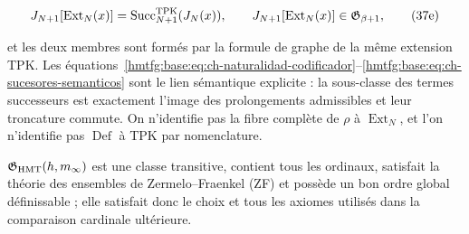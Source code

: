 \[
 J_{N+1}[\operatorname{Ext}_N(x)]
 =\operatorname{Succ}^{\rm TPK}_{N+1}(J_N(x)),
 \qquad
 J_{N+1}[\operatorname{Ext}_N(x)]
 \in\mathfrak G_{\beta+1},
\tag{37e}\label{hmtfg:base:eq:ch-sucesores-semanticos}
\]

et les deux membres sont formés par la formule de graphe de la même extension
TPK. Les équations~\eqref{hmtfg:base:eq:ch-naturalidad-codificador}--\eqref{hmtfg:base:eq:ch-sucesores-semanticos} sont le lien sémantique explicite : la
sous-classe des termes successeurs est exactement l’image des prolongements
admissibles et leur troncature commute. On n’identifie pas la fibre complète de
\(\rho\) à \(\operatorname{Ext}_N\), et l’on n’identifie pas
\(\operatorname{Def}\) à TPK par nomenclature.

\begin{lemma}
\label{hmtfg:base:thm:ch-6b}
\(\mathfrak G_{\rm HMT}(h,m_\infty)\) est une classe transitive, contient tous les ordinaux, satisfait la théorie des ensembles de Zermelo--Fraenkel (ZF) et possède un bon ordre global définissable ; elle satisfait donc le choix et tous les axiomes utilisés dans la comparaison cardinale ultérieure.

\end{lemma}
